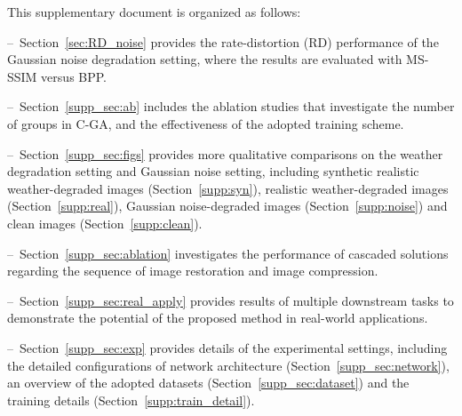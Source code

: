 \clearpage
\setcounter{page}{1}
\maketitlesupplementary
 
 
 

 
\noindent This supplementary document is organized as follows:


--\ Section~\ref{sec:RD_noise} provides the rate-distortion (RD) performance of the Gaussian noise degradation setting, where the results are evaluated with MS-SSIM versus BPP. 

--\ Section~\ref{supp_sec:ab} includes the ablation studies that investigate the number of groups in C-GA, and the effectiveness of the adopted training scheme.
 
--\ Section~\ref{supp_sec:figs} provides more qualitative comparisons on the weather degradation setting and Gaussian noise setting, including synthetic realistic weather-degraded images (Section~\ref{supp:syn}), realistic weather-degraded images (Section~\ref{supp:real}), Gaussian noise-degraded images (Section~\ref{supp:noise}) and clean images (Section~\ref{supp:clean}).  
 

--\ Section~\ref{supp_sec:ablation} investigates the performance of cascaded solutions regarding the sequence of image restoration and image compression.
  
 

  --\ Section~\ref{supp_sec:real_apply} provides results of multiple downstream tasks to demonstrate the potential of the proposed method in real-world applications.


--\ Section~\ref{supp_sec:exp} provides details of the experimental settings, including the detailed configurations of network architecture (Section~\ref{supp_sec:network}), an overview of the adopted datasets (Section~\ref{supp_sec:dataset}) and the training details (Section~\ref{supp:train_detail}). 
 

 



